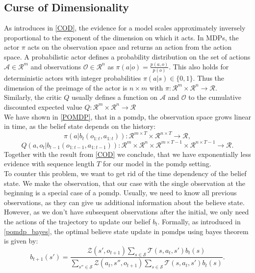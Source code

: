 \subsection{Curse of Dimensionality}
\label{COD_AC}
As introduces in \ref{COD}, the evidence for a model scales approximately inversely proportional to the exponent of the dimension on which it acts. In MDPs, the 
actor $\pi$ acts on the observation space and returns an action from the action space. A probabilistic actor defines a probability distribution on the set 
of actions $\mathcal{A} \in \mathcal{R}^m$ and observations $\mathcal{O} \in \mathcal{R}^n$ as $\pi(a|o) = \frac{p(a,o)}{p(o)}$. This also holds for 
deterministic actors with integer probabilities $\pi(a|s) \in \{0,1\}$.
Thus the dimension of the preimage of the actor is $n \times m$ with $\pi:\mathcal{R}^m \times \mathcal{R}^n \rightarrow \mathcal{R}$.\\
Similarly, the critic $Q$ usually defines a function on $\mathcal{A}$ and $\mathcal{O}$ to the cumulative discounted expected value 
$Q:\mathcal{R}^m \times \mathcal{R}^n \rightarrow \mathcal{R}$\\
We have shown in \ref{POMDP}, that in a \ac{pomdp}, the observation space grows linear in time, as the belief state depends on the history: 
$$\pi(a| b_t(o_{1:t}, a_{1:t})):\mathcal{R}^{m \times T} \times \mathcal{R}^{n \times T} \rightarrow \mathcal{R},$$
$$Q(a, o_{t}| b_{t-1}(o_{1:t-1}, a_{1:t-1})):\mathcal{R}^{m} \times \mathcal{R}^{n} \times \mathcal{R}^{m \times T-1} \times \mathcal{R}^{n \times T-1} \rightarrow \mathcal{R}.$$
Together with the result from \ref{COD} we conclude, that we have 
exponentially less evidence with sequence length $T$ for our model in the \ac{pomdp} setting.\\
To counter this problem, we want to get rid of the time dependency of the belief state. 
We make the observation, that our case with the single observation at the beginning is a special case of a \ac{pomdp}. Usually, 
we need to know all previous observations, as they can give us additional information about the believe state. However, as we don't have subsequent observations 
after the initial, we only need the actions of the trajectory to update our belief $b_t$. Formally, as introduced in \ref{pomdp_bayes}, the optimal believe state 
update in \ac{pomdp}s using bayes theorem is given by:
\begin{equation}
    b_{t+1}(s') = \frac{\mathcal{Z}(s', o_{t+1}) \sum_{s \in \mathcal{S}} \mathcal{T}(s, a_t, s') b_t(s)}{\sum_{s'' \in \mathcal{S}} \mathcal{Z}(a_t, s'', o_{t+1}) \sum_{s \in \mathcal{S}} \mathcal{T}(s, a_t, s') b_t(s)}.
\end{equation}
